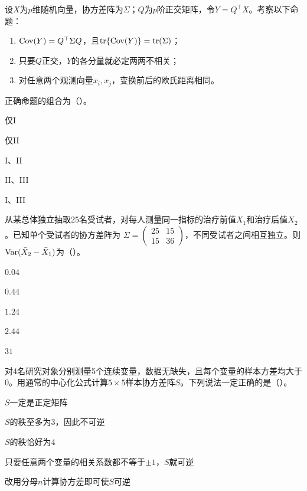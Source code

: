 \par\noindent\begin{minipage}{\linewidth}
设$X$为$p$维随机向量，协方差阵为$\Sigma$；$Q$为$p$阶正交矩阵，令$Y=Q^\top X$。考察以下命题：
\begin{enumerate}[label=\Roman*.]
\item $\operatorname{Cov}(Y)=Q^\top\Sigma Q$，且$\operatorname{tr}\{\operatorname{Cov}(Y)\}=\operatorname{tr}(\Sigma)$；
\item 只要$Q$正交，$Y$的各分量就必定两两不相关；
\item 对任意两个观测向量$x_i,x_j$，变换前后的欧氏距离相同。
\end{enumerate}
正确命题的组合为（\quad）。
\begin{choices}
\item 仅I
\item 仅II
\item I、II
\item II、III
\item I、III
\end{choices}
\end{minipage}\par\medskip

\par\noindent\begin{minipage}{\linewidth}
从某总体独立抽取25名受试者，对每人测量同一指标的治疗前值$X_1$和治疗后值$X_2$。已知单个受试者的协方差阵为
$\Sigma=\begin{pmatrix}25&15\\15&36\end{pmatrix}$，不同受试者之间相互独立。则$\operatorname{Var}(\bar X_2-\bar X_1)$为（\quad）。
\begin{choices}
\item $0.04$
\item $0.44$
\item $1.24$
\item $2.44$
\item $31$
\end{choices}
\end{minipage}\par\medskip

\par\noindent\begin{minipage}{\linewidth}
对4名研究对象分别测量5个连续变量，数据无缺失，且每个变量的样本方差均大于0。用通常的中心化公式计算$5\times5$样本协方差阵$S$。下列说法一定正确的是（\quad）。
\begin{choices}
\item $S$一定是正定矩阵
\item $S$的秩至多为3，因此不可逆
\item $S$的秩恰好为4
\item 只要任意两个变量的相关系数都不等于$\pm1$，$S$就可逆
\item 改用分母$n$计算协方差即可使$S$可逆
\end{choices}
\end{minipage}\par\medskip

